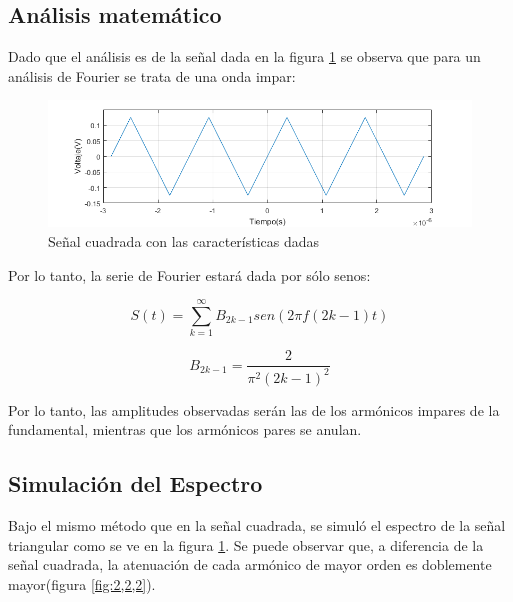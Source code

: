     \subsection{Análisis matemático}

    Dado que el análisis es de la señal dada en la figura \ref{fig:2,2,1}
    se observa que para un análisis de Fourier se trata de una onda
    impar:

    \begin{figure}[ht]
        \begin{center}
            \includegraphics[width=\linewidth]{contenido/img/sig_tri.png}
            \caption{Señal cuadrada con las características dadas}
            \label{fig:2,2,1}
        \end{center}
    \end{figure}

    Por lo tanto, la serie de Fourier estará dada por sólo senos:

    \begin{equation}
        S(t) = \sum_{k=1}^{\infty} B_{2k-1} sen(2 \pi f (2k-1) t)
    \end{equation}

    \begin{equation}
        B_{2k-1} =\frac{2}{\pi^2 (2k-1)^2}
    \end{equation}

    Por lo tanto, las amplitudes observadas serán las de los armónicos
    impares de la fundamental, mientras que los armónicos pares se anulan.

    \subsection{Simulación del Espectro}
    Bajo el mismo método que en la señal cuadrada, se simuló el espectro
    de la señal triangular como se ve en la figura \ref{fig:2,2,1}. Se puede
    observar que, a diferencia de la señal cuadrada, la atenuación de cada
    armónico de mayor orden es doblemente mayor(figura \ref{fig:2,2,2}).

